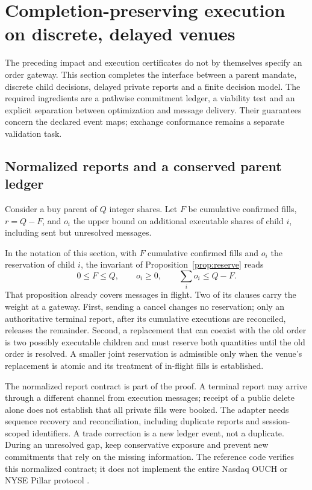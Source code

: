 \section{Completion-preserving execution on discrete, delayed venues}
\label{sec:productionexecution}

The preceding impact and execution certificates do not by themselves
specify an order gateway. This section completes the interface between a
parent mandate, discrete child decisions, delayed private reports and a
finite decision model. The required ingredients are a pathwise commitment
ledger, a viability test and an explicit separation between optimization
and message delivery. Their guarantees concern the declared event maps;
exchange conformance remains a separate validation task.

\subsection{Normalized reports and a conserved parent ledger}

Consider a buy parent of $Q$ integer shares. Let $F$ be cumulative confirmed
fills, $r=Q-F$, and $o_i$ the upper bound on additional executable shares of
child $i$, including sent but unresolved messages.

\begin{remark}\label{prop:productionledger}
In the notation of this section, with $F$ cumulative confirmed fills and $o_i$
the reservation of child $i$, the invariant of Proposition~\ref{prop:reserve}
reads
\begin{equation}\label{eq:productionreservation}
  0\le F\le Q,\qquad o_i\ge0,\qquad \sum_i o_i\le Q-F.
\end{equation}
That proposition already covers messages in flight. Two of its clauses carry
the weight at a gateway. First, sending a cancel changes no reservation; only
an authoritative terminal report, after its cumulative executions are
reconciled, releases the remainder. Second, a replacement that can coexist with
the old order is two possibly executable children and must reserve both
quantities until the old order is resolved. A smaller joint reservation is
admissible only when the venue's replacement is atomic and its treatment of
in-flight fills is established.
\end{remark}

The normalized report contract is part of the proof. A terminal report may
arrive through a different channel from execution messages; receipt of a
public delete alone does not establish that all private fills were booked.
The adapter needs sequence recovery and reconciliation, including duplicate
reports and session-scoped identifiers. A trade correction is a new ledger
event, not a duplicate. During an unresolved gap, keep conservative exposure
and prevent new commitments that rely on the missing information. The
reference code verifies this normalized contract; it does not implement the
entire Nasdaq OUCH or NYSE Pillar protocol \citep{ouch}.

